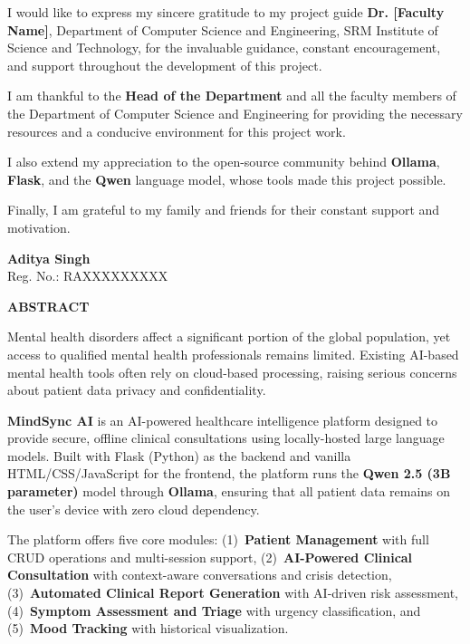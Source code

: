\documentclass[12pt,a4paper]{report}
\begin{document}
I would like to express my sincere gratitude to my project guide \textbf{Dr. [Faculty Name]}, Department of Computer Science and Engineering, SRM Institute of Science and Technology, for the invaluable guidance, constant encouragement, and support throughout the development of this project.

I am thankful to the \textbf{Head of the Department} and all the faculty members of the Department of Computer Science and Engineering for providing the necessary resources and a conducive environment for this project work.

I also extend my appreciation to the open-source community behind \textbf{Ollama}, \textbf{Flask}, and the \textbf{Qwen} language model, whose tools made this project possible.

Finally, I am grateful to my family and friends for their constant support and motivation.

\vspace{2cm}
\begin{flushright}
    \textbf{Aditya Singh}\\
    Reg. No.: RAXXXXXXXXX
\end{flushright}

\newpage
\thispagestyle{empty}
\begin{center}
    {\Large\textbf{\textcolor{srmblue}{ABSTRACT}}}\\[1.5cm]
\end{center}

Mental health disorders affect a significant portion of the global population, yet access to qualified mental health professionals remains limited. Existing AI-based mental health tools often rely on cloud-based processing, raising serious concerns about patient data privacy and confidentiality.

\textbf{MindSync AI} is an AI-powered healthcare intelligence platform designed to provide secure, offline clinical consultations using locally-hosted large language models. Built with Flask (Python) as the backend and vanilla HTML/CSS/JavaScript for the frontend, the platform runs the \textbf{Qwen 2.5 (3B parameter)} model through \textbf{Ollama}, ensuring that all patient data remains on the user's device with zero cloud dependency.

The platform offers five core modules: (1)~\textbf{Patient Management} with full CRUD operations and multi-session support, (2)~\textbf{AI-Powered Clinical Consultation} with context-aware conversations and crisis detection, (3)~\textbf{Automated Clinical Report Generation} with AI-driven risk assessment, (4)~\textbf{Symptom Assessment and Triage} with urgency classification, and (5)~\textbf{Mood Tracking} with historical visualization.
\end{document}
